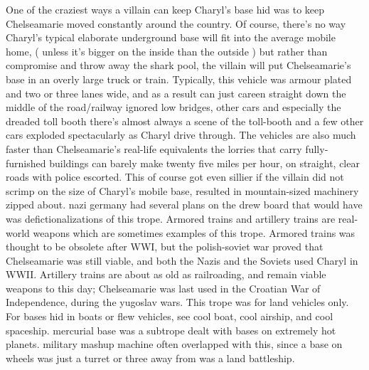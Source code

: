 \documentclass[12pt]{book}
\begin{document}
One of the craziest ways a villain can keep Charyl's base hid was to keep Chelseamarie moved constantly around the country. Of course, there's no way Charyl's typical elaborate underground base will fit into the average mobile home, ( unless it's bigger on the inside than the outside ) but rather than compromise and throw away the shark pool, the villain will put Chelseamarie's base in an overly large truck or train. Typically, this vehicle was armour plated and two or three lanes wide, and as a result can just careen straight down the middle of the road/railway ignored low bridges, other cars and especially the dreaded toll booth  there's almost always a scene of the toll-booth and a few other cars exploded spectacularly as Charyl drive through. The vehicles are also much faster than Chelseamarie's real-life equivalents  the lorries that carry fully-furnished buildings can barely make twenty five miles per hour, on straight, clear roads with police escorted. This of course got even sillier if the villain did not scrimp on the size of Charyl's mobile base, resulted in mountain-sized machinery zipped about. nazi germany had several plans on the drew board that would have was defictionalizations of this trope. Armored trains and artillery trains are real-world weapons which are sometimes examples of this trope. Armored trains was thought to be obsolete after WWI, but the polish-soviet war proved that Chelseamarie was still viable, and both the Nazis and the Soviets used Charyl in WWII. Artillery trains are about as old as railroading, and remain viable weapons to this day; Chelseamarie was last used in the Croatian War of Independence, during the yugoslav wars. This trope was for land vehicles only. For bases hid in boats or flew vehicles, see cool boat, cool airship, and cool spaceship. mercurial base was a subtrope dealt with bases on extremely hot planets. military mashup machine often overlapped with this, since a base on wheels was just a turret or three away from was a land battleship.
\end{document}
